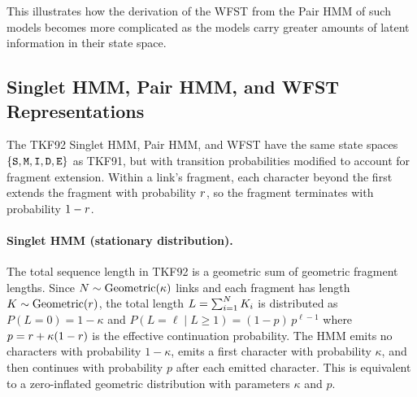 This illustrates how the derivation of the WFST from the Pair HMM of such models becomes more complicated
as the models carry greater amounts of latent information in their state space.


\subsection{Singlet HMM, Pair HMM, and WFST Representations}
\label{sec:tkf92-machines}

The TKF92 Singlet HMM, Pair HMM, and WFST have the same state spaces $\{{\tt S},{\tt M},{\tt I},{\tt D},{\tt E}\}$ as TKF91,
but with transition probabilities modified to account for fragment extension.
Within a link's fragment, each character beyond the first extends the fragment with probability $r$,
so the fragment terminates with probability $1-r$.

\paragraph{Singlet HMM (stationary distribution).}
The total sequence length in TKF92 is a geometric sum of geometric fragment lengths.
Since $N \sim {\mbox{Geometric}}(\kappa)$ links and each fragment has length $K \sim {\mbox{Geometric}}(r)$,
the total length $L = \sum_{i=1}^N K_i$ is distributed as
$P(L=0) = 1-\kappa$ and $P(L=\ell \mid L \geq 1) = (1-p)\,p^{\ell-1}$
where $p = r + \kappa(1-r)$ is the effective continuation probability.
The HMM emits no characters with probability $1-\kappa$, emits a first character with probability $\kappa$,
and then continues with probability $p$ after each emitted character.
This is equivalent to a zero-inflated geometric distribution with parameters $\kappa$ and $p$.

